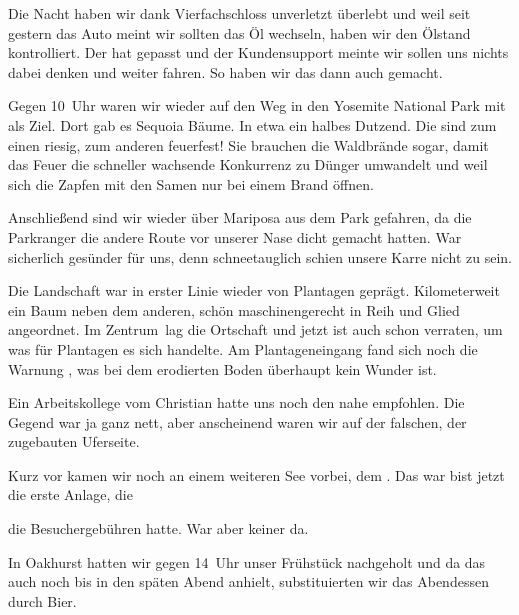 Die Nacht haben wir dank Vierfachschloss unverletzt überlebt und weil seit gestern das Auto meint wir sollten das Öl wechseln, haben wir den Ölstand kontrolliert.
Der hat gepasst und der Kundensupport meinte wir sollen uns nichts dabei denken und weiter fahren.
So haben wir das dann auch gemacht.

Gegen 10~Uhr waren wir wieder auf den Weg in den Yosemite National Park mit  als Ziel.
Dort gab es Sequoia Bäume.
In etwa ein halbes Dutzend.
Die sind zum einen riesig, zum anderen feuerfest!
Sie brauchen die Waldbrände sogar, damit das Feuer die schneller wachsende Konkurrenz zu Dünger umwandelt und weil sich die Zapfen mit den Samen nur bei einem Brand öffnen.

Anschließend sind wir wieder über Mariposa aus dem Park gefahren, da die Parkranger die andere Route vor unserer Nase dicht gemacht hatten.
War sicherlich gesünder für uns, denn schneetauglich schien unsere Karre nicht zu sein.

Die Landschaft war in erster Linie wieder von Plantagen geprägt.
Kilometerweit ein Baum neben dem anderen, schön maschinengerecht in Reih und Glied angeordnet.
Im \glqq Zentrum\grqq \, lag die Ortschaft  und jetzt ist auch schon verraten, um was für Plantagen es sich handelte.
Am Plantageneingang fand sich noch die Warnung , was bei dem erodierten Boden überhaupt kein Wunder ist.

Ein Arbeitskollege vom Christian hatte uns noch den  nahe  empfohlen.
Die Gegend war ja ganz nett, aber anscheinend waren wir auf der falschen, der zugebauten Uferseite.

Kurz vor  kamen wir noch an einem weiteren See vorbei, dem .
Das war bist jetzt die erste Anlage, die


\vspace*{.35\paperheight}
\noindent
die Besuchergebühren hatte.
War aber keiner da.

In Oakhurst hatten wir gegen 14~Uhr unser Frühstück nachgeholt und da das auch noch bis in den späten Abend anhielt, substituierten wir das Abendessen durch Bier.
